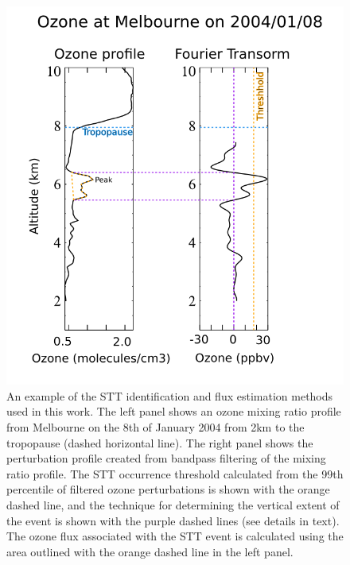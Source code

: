 \documentclass{article}
\begin{document}
    \begin{figure}[!htbp]
      \begin{center}
      \includegraphics[width=0.8\columnwidth]{figures/filtereg.png}
      \caption{ An example of the STT identification and flux estimation methods used in this work. 
	The left panel shows an ozone mixing ratio profile from Melbourne on the 8th of January 2004 from 2km to the tropopause (dashed horizontal line).
	The right panel shows the perturbation profile created from bandpass filtering of the mixing ratio profile. The STT occurrence threshold calculated from the 99th percentile of filtered ozone perturbations is shown with the orange dashed line, and the technique for determining the vertical extent of the event is shown with the purple dashed lines (see details in text).
	The ozone flux associated with the STT event is calculated using the area outlined with the orange dashed line in the left panel.
      }
      \label{fig:filterEG}
      \end{center}
    \end{figure}
    
\end{document}
